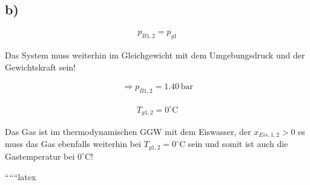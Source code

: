 

\subsection*{b)}

\begin{align*}
    p_{B1,2} = p_{g1}
\end{align*}

Das System muss weiterhin im Gleichgewicht mit dem Umgebungsdruck und der Gewichtskraft sein!

\begin{align*}
    \Rightarrow p_{B1,2} = 1.40 \, \text{bar}
\end{align*}

\begin{align*}
    T_{g1,2} = 0^\circ \text{C}
\end{align*}

Das Gas ist im thermodynamischen GGW mit dem Eiswasser, der $x_{Eis,1,2} > 0$ es muss das Gas ebenfalls weiterhin bei $T_{g1,2} = 0^\circ \text{C}$ sein und somit ist auch die Gastemperatur bei $0^\circ \text{C}$!

``````latex